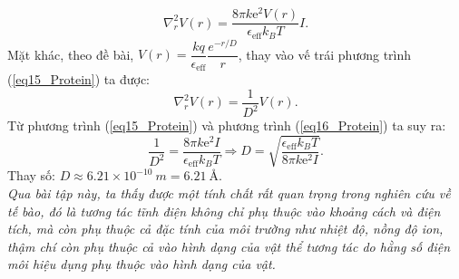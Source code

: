 \begin{enumerate}
\begin{equation}
    \nabla^2_r V(r)=\dfrac{8\pi k \text{e}^2 V(r)}{\epsilon_{\text{eff}}k_BT}I.
\end{equation}
Mặt khác, theo đề bài, $V(r)=\dfrac{kq}{\epsilon_{\text{eff}}}\dfrac{e^{-r/D}}{r}$, thay vào vế trái phương trình (\ref{eq15_Protein}) ta được:
\begin{equation} \label{eq16_Protein}
    \nabla^2_r V(r)=\dfrac{1}{D^2} V(r).
\end{equation}
Từ phương trình (\ref{eq15_Protein}) và phương trình (\ref{eq16_Protein}) ta suy ra:
\begin{equation} \label{eq17_Protein}
    \dfrac{1}{D^2}=\dfrac{8\pi k \text{e}^2 I}{\epsilon_{\text{eff}}k_BT} \Rightarrow 
    D= \sqrt{\dfrac{\epsilon_{\text{eff}}k_BT}{8\pi k \text{e}^2 I}}.
\end{equation}
Thay số: $D\approx 6.21\times 10^{-10}\ \si{m} = 6.21\ \si{\angstrom}$.\\
\textit{Qua bài tập này, ta thấy được một tính chất rất quan trọng trong nghiên cứu về tế bào, đó là tương tác tĩnh điện không chỉ phụ thuộc vào khoảng cách và điện tích, mà còn phụ thuộc cả đặc tính của môi trường như nhiệt độ, nồng độ ion, thậm chí còn phụ thuộc cả vào hình dạng của vật thể tương tác do hằng số điện môi hiệu dụng phụ thuộc vào hình dạng của vật.}
\end{enumerate}


